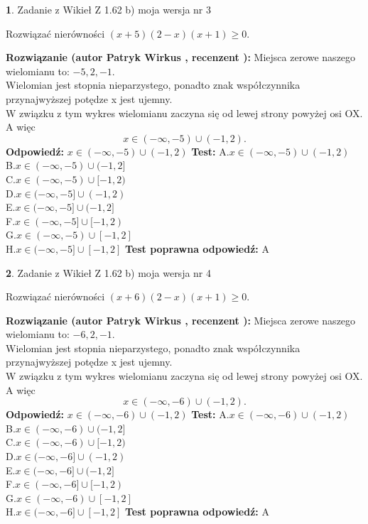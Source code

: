 \documentclass[12pt, a4paper]{article}
\theoremstyle{definition} %
\newtheorem{zad}{}
\newcommand{\zadStart}[1]{\begin{zad}#1\newline}
\newcommand{\zadStop}{\end{zad}}
\newcommand{\rozwStart}[2]{\noindent \textbf{Rozwiązanie (autor #1 , recenzent #2): }\newline}
\newcommand{\rozwStop}{\newline}
\newcommand{\odpStart}{\noindent \textbf{Odpowiedź:}\newline}
\newcommand{\odpStop}{\newline}
\newcommand{\testStart}{\noindent \textbf{Test:}\newline}
\newcommand{\testStop}{\newline}
\newcommand{\kluczStart}{\noindent \textbf{Test poprawna odpowiedź:}\newline}
\newcommand{\kluczStop}{\newline}
\begin{document}
\zadStart{Zadanie z Wikieł Z 1.62 b) moja wersja nr 3}

Rozwiązać nierówności $(x+5)(2-x)(x+1)\ge0$.
\zadStop
\rozwStart{Patryk Wirkus}{}
Miejsca zerowe naszego wielomianu to: $-5, 2, -1$.\\
Wielomian jest stopnia nieparzystego, ponadto znak współczynnika przy\linebreak najwyższej potędze x jest ujemny.\\ W związku z tym wykres wielomianu zaczyna się od lewej strony powyżej osi OX. A więc $$x \in (-\infty,-5) \cup (-1,2).$$
\rozwStop
\odpStart
$x \in (-\infty,-5) \cup (-1,2)$
\odpStop
\testStart
A.$x \in (-\infty,-5) \cup (-1,2)$\\
B.$x \in (-\infty,-5) \cup (-1,2]$\\
C.$x \in (-\infty,-5) \cup [-1,2)$\\
D.$x \in (-\infty,-5] \cup (-1,2)$\\
E.$x \in (-\infty,-5] \cup (-1,2]$\\
F.$x \in (-\infty,-5] \cup [-1,2)$\\
G.$x \in (-\infty,-5) \cup [-1,2]$\\
H.$x \in (-\infty,-5] \cup [-1,2]$
\testStop
\kluczStart
A
\kluczStop



\zadStart{Zadanie z Wikieł Z 1.62 b) moja wersja nr 4}

Rozwiązać nierówności $(x+6)(2-x)(x+1)\ge0$.
\zadStop
\rozwStart{Patryk Wirkus}{}
Miejsca zerowe naszego wielomianu to: $-6, 2, -1$.\\
Wielomian jest stopnia nieparzystego, ponadto znak współczynnika przy\linebreak najwyższej potędze x jest ujemny.\\ W związku z tym wykres wielomianu zaczyna się od lewej strony powyżej osi OX. A więc $$x \in (-\infty,-6) \cup (-1,2).$$
\rozwStop
\odpStart
$x \in (-\infty,-6) \cup (-1,2)$
\odpStop
\testStart
A.$x \in (-\infty,-6) \cup (-1,2)$\\
B.$x \in (-\infty,-6) \cup (-1,2]$\\
C.$x \in (-\infty,-6) \cup [-1,2)$\\
D.$x \in (-\infty,-6] \cup (-1,2)$\\
E.$x \in (-\infty,-6] \cup (-1,2]$\\
F.$x \in (-\infty,-6] \cup [-1,2)$\\
G.$x \in (-\infty,-6) \cup [-1,2]$\\
H.$x \in (-\infty,-6] \cup [-1,2]$
\testStop
\kluczStart
A
\kluczStop
\end{document}

